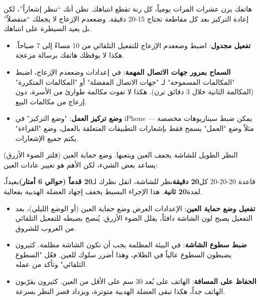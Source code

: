 هاتفك يرن عشرات المرات يومياً، كل رنة تقطع انتباهك. تظن أنك “تنظر إشعاراً”، لكن إعادة التركيز بعد كل مقاطعة تحتاج 15-20 دقيقة. وضععدم الإزعاج لا يجعلك “منفصلاً” بل يعيد السيطرة على انتباهك.

\begin{itemize}
  \item \textbf{تفعيل مجدول}: اضبط وضععدم الإزعاج للتفعيل التلقائي من 10 مساءً إلى 7 صباحاً. هكذا لا يوقظك هاتفك برسالة مزعجة.
  \item \textbf{السماح بمرور جهات الاتصال المهمة}: في إعدادات وضععدم الإزعاج، اضبط "المكالمات المسموحة" لـ "جهات الاتصال المفضلة" أو "المكالمات المتكررة" (المكالمة الثانية خلال 3 دقائق ترن). هكذا لا تفوت مكالمة طوارئ من الأسرة، دون إزعاج من مكالمات البيع.
  \item \textbf{وضع تركيز العمل}: "وضع التركيز" في iPhone يمكن ضبط سيناريوهات مخصصة — مثلاً وضع "العمل" يسمح فقط بإشعارات التطبيقات المتعلقة بالعمل، وضع "القراءة" يكتم جميع الإشعارات.
\end{itemize}


النظر الطويل للشاشة يجفف العين ويتعبها. وضع حماية العين (فلتر الضوء الأزرق) يساعد بعض الشيء، لكن الأهم هو تغيير عادات العين:

\begin{tcbinfo}{قاعدة 20-20-20}
كل\textbf{20 دقيقة}نظر للشاشة، انقل نظرك لـ\textbf{20 قدماً (حوالي 6 أمتار)}بعيداً، لمدة\textbf{20 ثانية}. هذا الإجراء البسيط يخفف إجهاد العضلة الهدبية بفعالية.

\end{tcbinfo}

\begin{itemize}
  \item \textbf{تفعيل وضع حماية العين}: الإعدادات العرض وضع حماية العين (أو الوضع الليلي)، بعد التفعيل يصبح لون الشاشة دافئاً، يقلل الضوء الأزرق. يُنصح بضبطه للتفعيل التلقائي من الغروب للشروق.
  \item \textbf{ضبط سطوع الشاشة}: في البيئة المظلمة يجب أن تكون الشاشة مظلمة. كثيرون يضبطون السطوع عالياً في الظلام، وهذا أضرر سلوك للعين. فعّل "السطوع التلقائي" وتأكد من عمله.
  \item \textbf{الحفاظ على المسافة}: الهاتف على بُعد 30 سم على الأقل من العين. كثيرون يقرّبون الهاتف جداً، هكذا تبقى العضلة الهدبية متوترة، ويزداد قصر النظر بسرعة.
\end{itemize}


